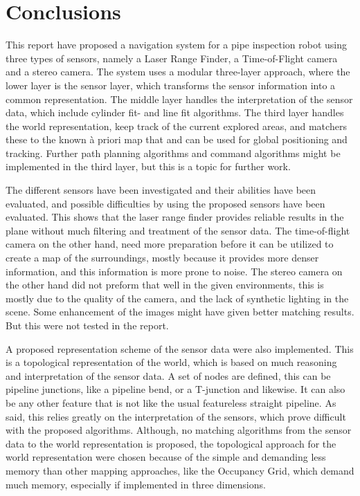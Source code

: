 
\chapter{Conclusions}
\label{chap9}
This report have proposed a navigation system for a pipe inspection robot using three
types of sensors, namely a Laser Range Finder, a Time-of-Flight camera and a stereo
camera. The system uses a modular three-layer approach, where the lower layer is the
sensor layer, which transforms the sensor information into a common representation. The
middle layer handles the interpretation of the sensor data, which include cylinder fit-
and line fit algorithms. The third layer handles the world representation, keep track of
the current explored areas, and matchers these to the known \`a priori map that and can be
used for global positioning and tracking. Further path planning algorithms and command
algorithms might be implemented in the third layer, but this is a topic for further work. 

The different sensors have been investigated and their abilities have been
evaluated, and possible difficulties by using the proposed sensors have been evaluated.
This shows that the laser range finder provides reliable results in the plane without much
filtering and treatment of the sensor data. The time-of-flight camera on the other hand,
need more preparation before it can be utilized to create a map of the surroundings,
mostly because it provides more denser information, and this information is more prone to
noise. The stereo camera on the other hand did not preform that well in the given
environments, this is mostly due to the quality of the camera, and the lack of synthetic
lighting in the scene. Some enhancement of the images might have given better matching
results. But this were not tested in the report. 

A proposed representation scheme of the sensor data were also implemented. This is a
topological representation of the world, which is based on much reasoning and
interpretation of the sensor data. A set of nodes are defined, this can be pipeline
junctions, like a pipeline bend, or a T-junction and likewise. It can also be any other
feature that is not like the usual featureless straight pipeline. As said, this relies
greatly on the interpretation of the sensors, which prove difficult with the proposed
algorithms. Although, no matching algorithms from the sensor data to the world
representation is proposed, the topological approach for the world representation were
chosen because of the simple and demanding less memory than other mapping approaches, like
the Occupancy Grid, which demand much memory, especially if implemented in three
dimensions. 

